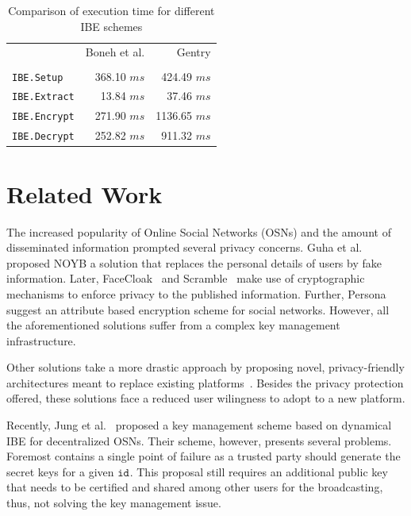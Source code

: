 \documentclass[journal]{IEEEtran}
\newcommand{\ms}{\ensuremath{ms}}
\newcommand{\id}[1]{\ensuremath{\mathtt{id}_{#1}}}
\begin{document}
\begin{table}
\begin{center}
\begin{tabular}{ | l | r | r |}
    \cline{2-3}
   \multicolumn{1}{c|}{}& Boneh et al. & Gentry \\ 
   \cline{2-3} 
        \multicolumn{3}{c}{\vspace{-3mm}} \\ \hline 
  \texttt{IBE.Setup} & 368.10 \ms &  424.49 \ms \\
  \texttt{IBE.Extract} & 13.84 \ms & 37.46 \ms \\
  \texttt{IBE.Encrypt} & 271.90 \ms & 1136.65 \ms \\
  \texttt{IBE.Decrypt} & 252.82 \ms & 911.32 \ms\\ \hline 
\end{tabular}
\end{center}
\caption{Comparison of execution time for different IBE schemes}
\label{table:exec_times}
\end{table}



\section{Related Work}\label{sec:relwork}
The increased popularity of Online Social Networks (OSNs) and the amount of disseminated information prompted several privacy concerns. 
Guha et al.~\cite{Guha:2008} proposed NOYB a solution that replaces the personal details of users by fake information. Later, FaceCloak~\cite{Luo:2009} and Scramble~\cite{BeatoScramble} make use of cryptographic mechanisms to enforce privacy to the published information. Further, Persona suggest an attribute based encryption scheme for social networks. However, all the aforementioned solutions suffer from a complex key management infrastructure. 


Other solutions take a more drastic approach by proposing novel, privacy-friendly architectures meant to replace existing platforms~\cite{DBLP:conf/sp/CristofaroSTW12,NYT2010.Diaspora,DBLP:conf/wowmom/CutilloMO11}. Besides the privacy protection offered, these solutions face a reduced user wilingness to adopt to a new platform.

Recently, Jung et al.~\cite{jung} proposed a key management scheme based on dynamical IBE for decentralized OSNs. Their scheme, however, presents several problems. Foremost contains a single point of failure as a trusted party should generate the secret keys for a given \id{}. This proposal still requires an additional public key that needs to be certified and shared among other users for the broadcasting, thus, not solving the key management issue.
\end{document}
